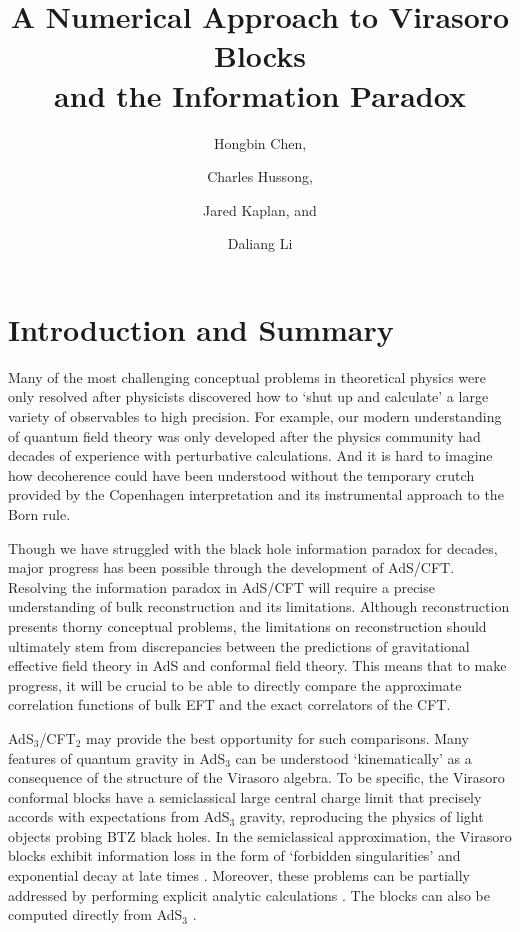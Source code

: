 \documentclass[12pt]{article}
\title{A Numerical Approach to Virasoro Blocks \\ and the Information Paradox}
\author{Hongbin Chen,}
\author{Charles Hussong,}
\author{Jared Kaplan, and}
\author{Daliang Li}
\affiliation{Department of Physics and Astronomy,  Johns Hopkins University, \\
Charles Street, Baltimore, MD 21218, U.S.A.}
\numberwithin{equation}{section}
\begin{document}
\maketitle
\flushbottom
 
\section{Introduction and Summary}

 

Many of the most challenging conceptual problems in theoretical physics were only resolved after physicists discovered how to `shut up and calculate' a large variety of observables to high precision.  For example, our modern understanding of quantum field theory was only developed after the physics community had decades of experience with perturbative calculations.  And it is hard to imagine how decoherence could have been understood without the temporary crutch provided by the Copenhagen interpretation and its instrumental approach to the Born rule.

Though we have struggled with the black hole information paradox for decades,  major progress has been possible through the development of AdS/CFT.  Resolving the information paradox in AdS/CFT will require a precise understanding of bulk reconstruction and its limitations.  Although reconstruction presents thorny conceptual problems, the limitations on reconstruction  should ultimately stem from discrepancies between the predictions of gravitational effective field theory in AdS and conformal field theory. This means that to make progress, it will be crucial to be able to directly compare the approximate correlation functions of bulk EFT and the exact correlators of the CFT.  

AdS$_3$/CFT$_2$ may provide the best opportunity for such comparisons.
Many features of quantum gravity in AdS$_3$ can be understood  `kinematically' as a consequence of the structure of the Virasoro algebra.  To be specific, the Virasoro conformal blocks have a semiclassical large central charge limit that precisely accords with expectations from AdS$_3$ gravity, reproducing the physics of light objects probing BTZ black holes.  In the semiclassical approximation, the Virasoro blocks exhibit information loss in the form of `forbidden singularities' and exponential decay at late times \cite{Fitzpatrick:2014vua, Fitzpatrick:2015zha, Fitzpatrick:2015foa, Fitzpatrick:2015dlt, Fitzpatrick:2016mjq, Anous:2016kss}.  Moreover, these problems can be partially addressed by performing explicit analytic calculations \cite{Fitzpatrick:2016ive}.  The  blocks can also be computed directly from AdS$_3$ \cite{KrausBlocks, Hijano:2015qja, Besken:2016ooo, Alkalaev:2015wia, Alkalaev:2015lca, Hulik:2016ifr, Fitzpatrick:2016mtp, Besken:2017fsj}.
\end{document}
